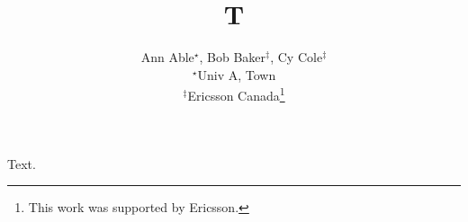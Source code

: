 \documentclass{article}
\begin{document}
\title{T}
\author{Ann Able$^{\star}$, Bob Baker$^{\ddagger}$, Cy Cole$^{\ddagger}$\\
$^{\star}$Univ A, Town\\
$^{\ddagger}$Ericsson Canada\thanks{This work was supported by Ericsson.}}
\maketitle
Text.
\end{document}
